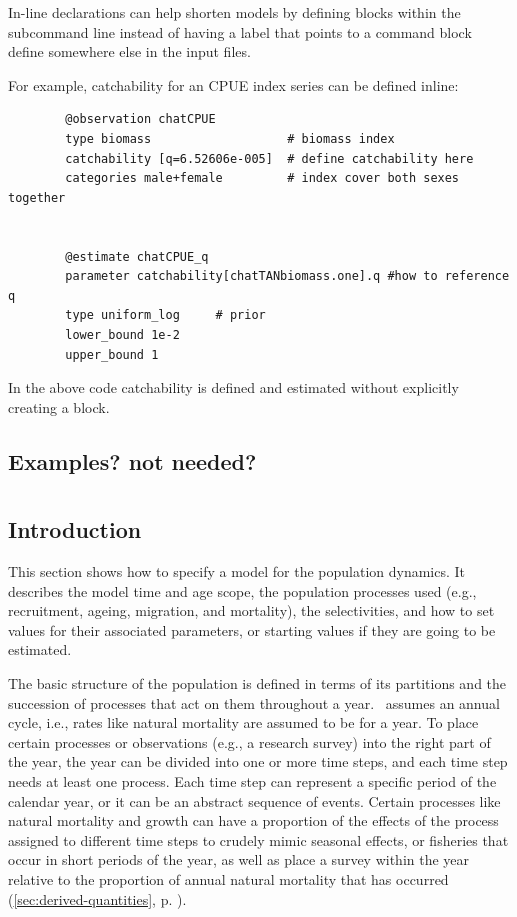 In-line declarations can help shorten models by defining \command{} blocks within the subcommand line instead of having a label that points to a command block define somewhere else in the input files.

For example, catchability for an CPUE index series can be defined inline:

{\small{\begin{verbatim}
		@observation chatCPUE
		type biomass                   # biomass index
		catchability [q=6.52606e-005]  # define catchability here
		categories male+female         # index cover both sexes together


		@estimate chatCPUE_q
		parameter catchability[chatTANbiomass.one].q #how to reference q
		type uniform_log     # prior
		lower_bound 1e-2
		upper_bound 1
		\end{verbatim}}}

In the above code catchability is defined and estimated without explicitly creating a  block.

\subsection{Examples? not needed?}

\section{\label{sec:population-section}}

\subsection{Introduction}

This section shows how to specify a model for the population dynamics. It describes the model time and age scope, the population processes used (e.g., recruitment, ageing, migration, and mortality), the selectivities, and how to set values for their associated parameters, or starting values if they are going to be estimated.

The basic structure of the population is defined in terms of its partitions and the succession of processes that act on them throughout a year. \CNAME~assumes an annual cycle, i.e., rates like natural mortality are assumed to be for a year. To place certain processes or observations (e.g., a research survey) into the right part of the year, the year can be divided into one or more time steps, and each time step needs  at least one process. Each time step can represent a specific period of the calendar year, or it can be an abstract sequence of events. Certain processes like natural mortality and growth can have a proportion of the effects of the process assigned to different time steps to crudely mimic seasonal effects, or fisheries that occur in short periods of the year, as well as place a survey within the year relative to the proportion of annual natural mortality that has occurred (\ref{sec:derived-quantities}, p. \pageref{sec:derived-quantities}).

